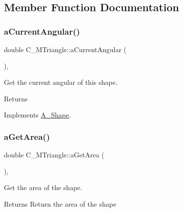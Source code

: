\subsection{Member Function Documentation}
\mbox{\label{classC__MTriangle_aad1e42f1ec9c486736a403128ba47179}} 
\subsubsection{\texorpdfstring{a\+Current\+Angular()}{aCurrentAngular()}}
{\footnotesize\ttfamily double C\+\_\+\+M\+Triangle\+::a\+Current\+Angular (\begin{DoxyParamCaption}{ }\end{DoxyParamCaption})\hspace{0.3cm}{\ttfamily [override]}, {\ttfamily [virtual]}}



Get the current angular of this shape. 

\begin{DoxyReturn}{Returns}

\end{DoxyReturn}


Implements \hyperlink{classA__Shape_a80fa4e009c875dd0ba7fc5bfeeb43f98}{A\+\_\+\+Shape}.

\mbox{\label{classC__MTriangle_a1baff5085fc1b9822987e3fc307550ce}} 
\subsubsection{\texorpdfstring{a\+Get\+Area()}{aGetArea()}}
{\footnotesize\ttfamily double C\+\_\+\+M\+Triangle\+::a\+Get\+Area (\begin{DoxyParamCaption}{ }\end{DoxyParamCaption})\hspace{0.3cm}{\ttfamily [override]}, {\ttfamily [virtual]}}



Get the area of the shape. 

\begin{DoxyReturn}{Returns}
Return the area of the shape 
\end{DoxyReturn}


